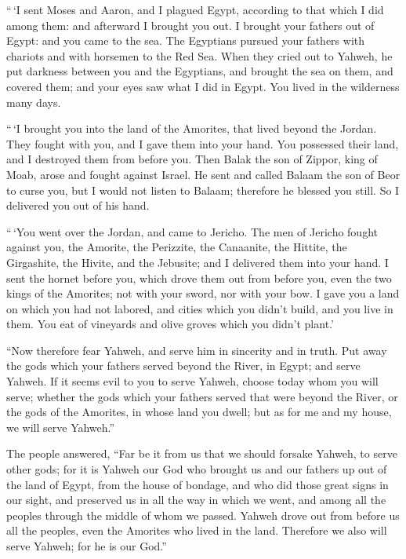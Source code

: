  ``\,`I sent Moses and Aaron, and I plagued Egypt,
according to that which I did among them: and afterward I brought you
out.  I brought your fathers out of Egypt: and you came to
the sea. The Egyptians pursued your fathers with chariots and with
horsemen to the Red Sea.  When they cried out to Yahweh,
he put darkness between you and the Egyptians, and brought the sea on
them, and covered them; and your eyes saw what I did in Egypt. You lived
in the wilderness many days.

 ``\,`I brought you into the land of the Amorites, that
lived beyond the Jordan. They fought with you, and I gave them into your
hand. You possessed their land, and I destroyed them from before you.
 Then Balak the son of Zippor, king of Moab, arose and
fought against Israel. He sent and called Balaam the son of Beor to
curse you,  but I would not listen to Balaam; therefore
he blessed you still. So I delivered you out of his hand.

 ``\,`You went over the Jordan, and came to Jericho. The
men of Jericho fought against you, the Amorite, the Perizzite, the
Canaanite, the Hittite, the Girgashite, the Hivite, and the Jebusite;
and I delivered them into your hand.  I sent the hornet
before you, which drove them out from before you, even the two kings of
the Amorites; not with your sword, nor with your bow.  I
gave you a land on which you had not labored, and cities which you
didn't build, and you live in them. You eat of vineyards and olive
groves which you didn't plant.'

 ``Now therefore fear Yahweh, and serve him in sincerity
and in truth. Put away the gods which your fathers served beyond the
River, in Egypt; and serve Yahweh.  If it seems evil to
you to serve Yahweh, choose today whom you will serve; whether the gods
which your fathers served that were beyond the River, or the gods of the
Amorites, in whose land you dwell; but as for me and my house, we will
serve Yahweh.''

 The people answered, ``Far be it from us that we should
forsake Yahweh, to serve other gods;  for it is Yahweh
our God who brought us and our fathers up out of the land of Egypt, from
the house of bondage, and who did those great signs in our sight, and
preserved us in all the way in which we went, and among all the peoples
through the middle of whom we passed.  Yahweh drove out
from before us all the peoples, even the Amorites who lived in the land.
Therefore we also will serve Yahweh; for he is our God.''

